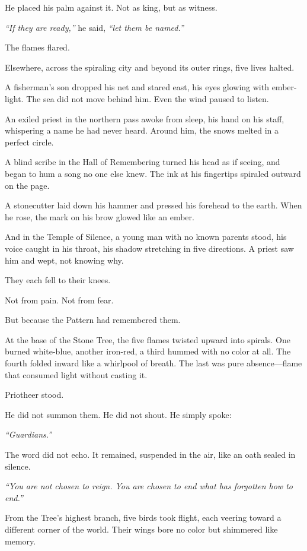 \documentclass[12pt]{article}
\begin{document}
He placed his palm against it. Not as king, but as witness.

\emph{``If they are ready,''} he said, \emph{``let them be named.''}

The flames flared.

Elsewhere, across the spiraling city and beyond its outer rings, five lives halted.

A fisherman's son dropped his net and stared east, his eyes glowing with ember-light. The sea did not move behind him. Even the wind paused to listen.

An exiled priest in the northern pass awoke from sleep, his hand on his staff, whispering a name he had never heard. Around him, the snows melted in a perfect circle.

A blind scribe in the Hall of Remembering turned his head as if seeing, and began to hum a song no one else knew. The ink at his fingertips spiraled outward on the page.

A stonecutter laid down his hammer and pressed his forehead to the earth. When he rose, the mark on his brow glowed like an ember.

And in the Temple of Silence, a young man with no known parents stood, his voice caught in his throat, his shadow stretching in five directions. A priest saw him and wept, not knowing why.

They each fell to their knees.

Not from pain. Not from fear.

But because the Pattern had remembered them.

At the base of the Stone Tree, the five flames twisted upward into spirals. One burned white-blue, another iron-red, a third hummed with no color at all. The fourth folded inward like a whirlpool of breath. The last was pure absence—flame that consumed light without casting it.

Priotheer stood.

He did not summon them. He did not shout. He simply spoke:

\emph{``Guardians.''}

The word did not echo. It remained, suspended in the air, like an oath sealed in silence.

\emph{``You are not chosen to reign. You are chosen to end what has forgotten how to end.''}

From the Tree’s highest branch, five birds took flight, each veering toward a different corner of the world. Their wings bore no color but shimmered like memory.
\end{document}
